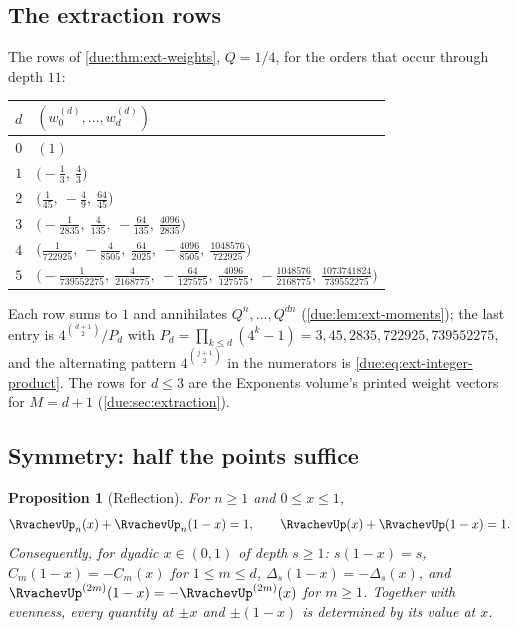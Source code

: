 \documentclass[11pt,oneside]{article}
\theoremstyle{plain}
\newtheorem{proposition}[theorem]{Proposition}
\theoremstyle{definition}
\theoremstyle{remark}
\newcommand{\upn}[1]{\RvachevUp_{#1}}
\newcommand{\dep}[1]{s\!\left(#1\right)}                    %
\newcommand{\Qq}{Q}                                         %
\newcommand{\Cr}[2]{C_{#1}\!\left(#2\right)}                %
\newcommand{\Wrow}[2]{w^{(#1)}_{#2}}                        %
\begin{document}
\subsection{The extraction rows}
\label{due:sec:exr-rows}

The rows of \cref{due:thm:ext-weights}, $\Qq=1/4$, for the orders that
occur through depth $11$:
\begin{center}
\begin{tabular}{@{}cl@{}}
\toprule
$d$ & $(\Wrow{d}{0},\ldots,\Wrow{d}{d})$\\
\midrule
$0$ & $(1)$\\
$1$ & $\bigl(-\tfrac13,\ \tfrac43\bigr)$\\
$2$ & $\bigl(\tfrac1{45},\ -\tfrac49,\ \tfrac{64}{45}\bigr)$\\
$3$ & $\bigl(-\tfrac1{2835},\ \tfrac4{135},\ -\tfrac{64}{135},\ \tfrac{4096}{2835}\bigr)$\\
$4$ & $\bigl(\tfrac1{722925},\ -\tfrac4{8505},\ \tfrac{64}{2025},\ -\tfrac{4096}{8505},\ \tfrac{1048576}{722925}\bigr)$\\
$5$ & $\bigl(-\tfrac1{739552275},\ \tfrac4{2168775},\ -\tfrac{64}{127575},\ \tfrac{4096}{127575},\ -\tfrac{1048576}{2168775},\ \tfrac{1073741824}{739552275}\bigr)$\\
\bottomrule
\end{tabular}
\end{center}
Each row sums to $1$ and annihilates $\Qq^{n},\ldots,\Qq^{dn}$
(\cref{due:lem:ext-moments}); the last entry is
$4^{\binom{d+1}{2}}/P_{d}$ with $P_{d}=\prod_{k\le d}(4^{k}-1)=3,45,2835,
722925,739552275$, and the alternating pattern $4^{\binom{j+1}{2}}$ in the
numerators is \cref{due:eq:ext-integer-product}.  The rows for $d\le3$ are
the Exponents volume's printed weight vectors for $M=d+1$
(\cref{due:sec:extraction}).

\subsection{Symmetry: half the points suffice}
\label{due:sec:exr-symmetry}

\begin{proposition}[Reflection]
\label{due:prop:exr-symmetry}
For $n\ge1$ and $0\le x\le1$,
\begin{equation}
 \upn{n}(x)+\upn{n}(1-x)=1,
 \qquad
 \RvachevUp(x)+\RvachevUp(1-x)=1 .
 \label{due:eq:exr-reflection}
\end{equation}
Consequently, for dyadic $x\in(0,1)$ of depth $s\ge1$: $\dep{1-x}=s$,
$\Cr{m}{1-x}=-\Cr{m}{x}$ for $1\le m\le d$, $\Delta_{s}(1-x)=-\Delta_{s}(x)$,
and $\RvachevUp^{(2m)}(1-x)=-\RvachevUp^{(2m)}(x)$ for $m\ge1$.  Together
with evenness, every quantity at $\pm x$ and $\pm(1-x)$ is determined by
its value at $x$.
\end{proposition}
\end{document}
